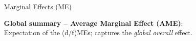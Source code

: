 \documentclass[10pt,compress,t,notes=noshow, xcolor=table]{beamer}
\begin{document}
\begin{framei}[align=top]{Marginal Effects (ME)  }
\item \textbf{Global summary -- Average Marginal Effect (AME)}:\\
Expectation of the (d/f)MEs; captures the \emph{global overall} effect.
\end{framei}



\end{document}
